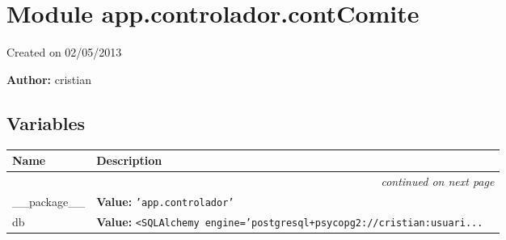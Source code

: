 %
%
%


\section{Module app.controlador.contComite}

    \label{app:controlador:contComite}
Created on 02/05/2013

\textbf{Author:} cristian





  \subsection{Variables}

    \vspace{-1cm}
\hspace{\varindent}\begin{longtable}{|p{\varnamewidth}|p{\vardescrwidth}|l}
\cline{1-2}
\cline{1-2} \centering \textbf{Name} & \centering \textbf{Description}& \\
\cline{1-2}
\endhead\cline{1-2}\multicolumn{3}{r}{\small\textit{continued on next page}}\\\endfoot\cline{1-2}
\endlastfoot\raggedright \_\-\_\-p\-a\-c\-k\-a\-g\-e\-\_\-\_\- & \raggedright \textbf{Value:} 
{\tt \texttt{'}\texttt{app.controlador}\texttt{'}}&\\
\cline{1-2}
\raggedright d\-b\- & \raggedright \textbf{Value:} 
{\tt {\textless}SQLAlchemy engine='postgresql+psycopg2://cristian:usuari\texttt{...}}&\\
\cline{1-2}
\end{longtable}



